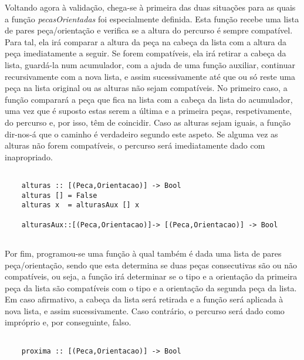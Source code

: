 \documentclass[a4paper]{report} %
\begin{document}
  \newpage
    
  \par \noindent Voltando agora à validação, chega-se à primeira das duas situações para as quais a função \textit{pecasOrientadas} foi especialmente definida. Esta função recebe uma lista de pares peça/orientação e verifica se a altura do percurso é sempre compatível. Para tal, ela irá comparar a altura da peça na cabeça da lista com a altura da peça imediatamente a seguir. Se forem compatíveis, ela irá retirar a cabeça da lista, guardá-la num acumulador, com a ajuda de uma função auxiliar, continuar recursivamente com a nova lista, e assim sucessivamente até que ou só reste uma peça na lista original ou as alturas não sejam compatíveis. No primeiro caso, a função comparará a peça que fica na lista com a cabeça da lista do acumulador, uma vez que é suposto estas serem a última e a primeira peças, respetivamente, do percurso e, por isso, têm de coincidir. Caso as alturas sejam iguais, a função dir-nos-á que o caminho é verdadeiro segundo este aspeto. Se alguma vez as alturas não forem compatíveis, o percurso será imediatamente dado com inapropriado.

  \begin{verbatim}
    
    alturas :: [(Peca,Orientacao)] -> Bool
    alturas [] = False
    alturas x  = alturasAux [] x
    
    alturasAux::[(Peca,Orientacao)]-> [(Peca,Orientacao)] -> Bool
    
  \end{verbatim}

  \par \noindent Por fim, programou-se uma função à qual também é dada uma lista de pares peça/orientação, sendo que esta determina se duas peças consecutivas são ou não compatíveis, ou seja, a função irá determinar se o tipo e a orientação da primeira peça da lista são compatíveis com o tipo e a orientação da segunda peça da lista. Em caso afirmativo, a cabeça da lista será retirada e a função será aplicada à nova lista, e assim sucessivamente. Caso contrário, o percurso será dado como impróprio e, por conseguinte, falso.

  \begin{verbatim}
    
    proxima :: [(Peca,Orientacao)] -> Bool
    
  \end{verbatim}
  
  \newpage
\end{document}
